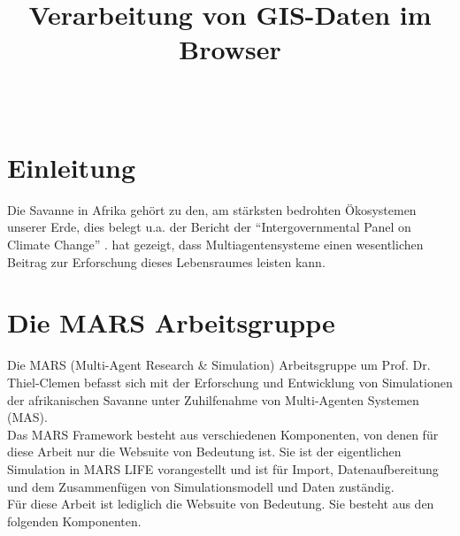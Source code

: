 \documentclass[10pt,conference,compsocconf]{IEEEtran}
\begin{document}
	\title{\textbf{\Large Verarbeitung von GIS-Daten im Browser}\\[0.2ex]}
	
	\author{
		\\
	}
	
\maketitle

\IEEEpeerreviewmaketitle



\section{Einleitung}
Die Savanne in Afrika gehört zu den, am stärksten bedrohten Ökosystemen unserer Erde, dies belegt u.a. der Bericht der \enquote{Intergovernmental Panel on Climate Change} \cite{climateReport}.
\cite{LUDAS} hat gezeigt, dass Multiagentensysteme einen wesentlichen Beitrag zur Erforschung dieses Lebensraumes leisten kann. \\



\section{Die MARS Arbeitsgruppe}
Die MARS (Multi-Agent Research \& Simulation) Arbeitsgruppe um Prof. Dr. Thiel-Clemen befasst sich mit der Erforschung und Entwicklung von Simulationen der afrikanischen Savanne unter Zuhilfenahme von Multi-Agenten Systemen (MAS). \\
Das MARS Framework besteht aus verschiedenen Komponenten, von denen für diese Arbeit nur die Websuite von Bedeutung ist. Sie ist der eigentlichen Simulation in MARS LIFE vorangestellt und ist für Import, Datenaufbereitung und dem Zusammenfügen von Simulationsmodell und Daten zuständig. \\
Für diese Arbeit ist lediglich die Websuite von Bedeutung. Sie besteht aus den folgenden Komponenten. \\
\end{document}
